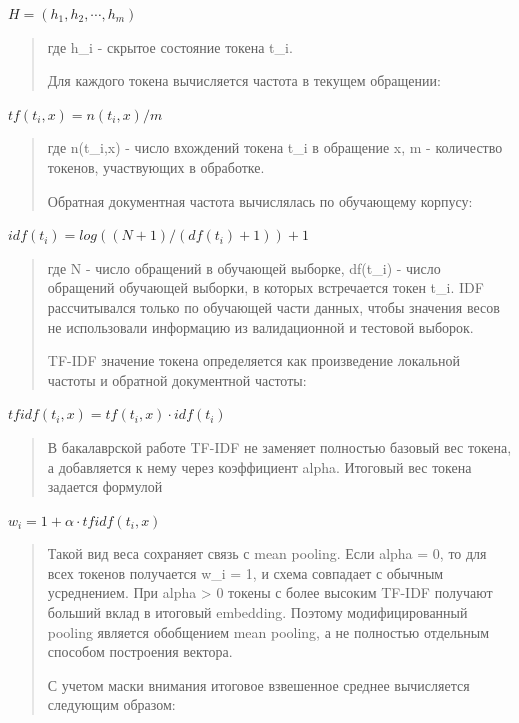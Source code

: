 \documentclass[
]{article}
\begin{document}
\(H = \left( h_{1},h_{2},\cdots,h_{m} \right)\)

\begin{quote}
где h\_i - скрытое состояние токена t\_i.

Для каждого токена вычисляется частота в текущем обращении:
\end{quote}

\(tf\left( t_{i},x \right) = n\left( t_{i},x \right)/m\)

\begin{quote}
где n(t\_i,x) - число вхождений токена t\_i в обращение x, m -
количество токенов, участвующих в обработке.

Обратная документная частота вычислялась по обучающему корпусу:
\end{quote}

\(idf\left( t_{i} \right) = log\left( (N + 1)/\left( df\left( t_{i} \right) + 1 \right) \right) + 1\)

\begin{quote}
где N - число обращений в обучающей выборке, df(t\_i) - число обращений
обучающей выборки, в которых встречается токен t\_i. IDF рассчитывался
только по обучающей части данных, чтобы значения весов не использовали
информацию из валидационной и тестовой выборок.

TF-IDF значение токена определяется как произведение локальной частоты и
обратной документной частоты:
\end{quote}

\(tfidf\left( t_{i},x \right) = tf\left( t_{i},x \right) \cdot idf\left( t_{i} \right)\)

\begin{quote}
В бакалаврской работе TF-IDF не заменяет полностью базовый вес токена, а
добавляется к нему через коэффициент alpha. Итоговый вес токена задается
формулой
\end{quote}

\(w_{i} = 1 + \alpha \cdot tfidf\left( t_{i},x \right)\)

\begin{quote}
Такой вид веса сохраняет связь с mean pooling. Если alpha = 0, то для
всех токенов получается w\_i = 1, и схема совпадает с обычным
усреднением. При alpha \textgreater{} 0 токены с более высоким TF-IDF
получают больший вклад в итоговый embedding. Поэтому модифицированный
pooling является обобщением mean pooling, а не полностью отдельным
способом построения вектора.

С учетом маски внимания итоговое взвешенное среднее вычисляется
следующим образом:
\end{quote}
\end{document}
